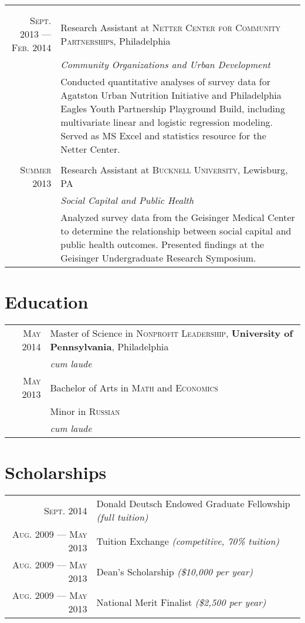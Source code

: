 \documentclass[a4paper,10pt]{article}
\begin{document}
\begin{tabular}{r|p{9.5cm}}
{    }\\ 
  \multicolumn{2}{c}{} \\ 
  \textsc{Sept. 2013 --- Feb. 2014} & Research Assistant at \textsc{Netter Center for Community Partnerships}, Philadelphia \\ 
    &\emph{Community Organizations and Urban Development}\\ 
    &\footnotesize{ 
      Conducted quantitative analyses of survey data for Agatston Urban Nutrition Initiative and Philadelphia Eagles Youth Partnership Playground Build, including multivariate linear and logistic regression modeling. Served as MS Excel and statistics resource for the Netter Center. 
    }\\ 
  \multicolumn{2}{c}{} \\ 
  \textsc{Summer 2013} & Research Assistant at \textsc{Bucknell University}, Lewisburg, PA \\ 
    &\emph{Social Capital and Public Health}\\ 
    &\footnotesize{ 
      Analyzed survey data from the Geisinger Medical Center to determine the relationship between social capital and public health outcomes. Presented findings at the Geisinger Undergraduate Research Symposium.
    }
\end{tabular}

\section{Education} 
  \begin{tabular}{rp{10cm}}	 
    \textsc{May} 2014 & Master of Science in \textsc{Nonprofit Leadership}, \textbf{University of Pennsylvania}, Philadelphia\\  
      & \small\emph{cum laude}\\ 
    \textsc{May} 2013 & Bachelor of Arts in \textsc{Math} and \textsc{Economics} \\ 
      & Minor in \textsc{Russian} \\ 
      & \small\emph{cum laude}\\
\end{tabular}

\section{Scholarships} 
  \begin{tabular}{rl} 
    \textsc{Sept.} 2014 & Donald Deutsch Endowed Graduate Fellowship \small\emph{(full tuition)}\\ \textsc{Aug.} 2009 --- \textsc{May} 2013 & Tuition Exchange \small\emph{(competitive, 70\% tuition)}\\ 
    \textsc{Aug.} 2009 --- \textsc{May} 2013 & Dean's Scholarship \small\emph{(\$10,000 per year)}\\ 
    \textsc{Aug.} 2009 --- \textsc{May} 2013 & National Merit Finalist \small\emph{(\$2,500 per year)}\\
\end{tabular}
\end{document}
